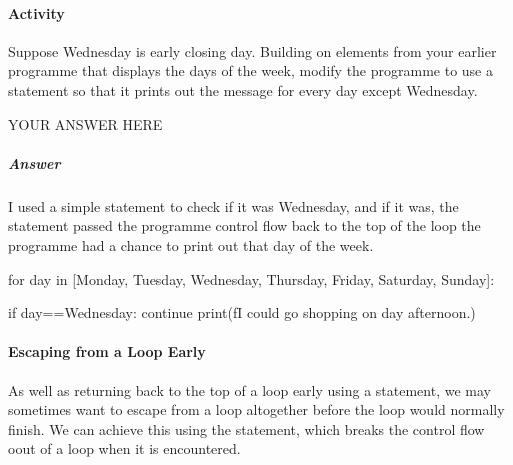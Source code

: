 \documentclass[letterpaper,10pt,english]{sphinxmanual}
\begin{document}
{\paragraph{Activity}
\label{\detokenize{content/02_Robot_Lab/Section_00_01:id1}}
Suppose Wednesday is early closing day. Building on elements from your earlier programme that displays the days of the week, modify the programme to use a  statement so that it prints out the message  for every day except Wednesday.

{
\begin{sphinxVerbatim}[commandchars=\\\{\}]
\llap{\color{nbsphinxin}[ ]:\,\hspace{\fboxrule}\hspace{\fboxsep}}\PYGZsh{} YOUR ANSWER HERE
\end{sphinxVerbatim}
}


\subparagraph{Answer}
\label{\detokenize{content/02_Robot_Lab/Section_00_01:id2}}

I used a simple  statement to check if it was Wednesday, and if it was, the  statement passed the programme control flow back to the top of the loop  the programme had a chance to print out that day of the week.

{
\begin{sphinxVerbatim}[commandchars=\\\{\}]
\llap{\color{nbsphinxin}[ ]:\,\hspace{\fboxrule}\hspace{\fboxsep}}for day in [\PYGZsq{}Monday\PYGZsq{}, \PYGZsq{}Tuesday\PYGZsq{}, \PYGZsq{}Wednesday\PYGZsq{},
            \PYGZsq{}Thursday\PYGZsq{}, \PYGZsq{}Friday\PYGZsq{}, \PYGZsq{}Saturday\PYGZsq{}, \PYGZsq{}Sunday\PYGZsq{}]:

    if day==\PYGZsq{}Wednesday\PYGZsq{}:
        continue
    print(f\PYGZdq{}I could go shopping on \PYGZob{}day\PYGZcb{} afternoon.\PYGZdq{})
\end{sphinxVerbatim}
}


\paragraph{Escaping from a Loop Early}
\label{\detokenize{content/02_Robot_Lab/Section_00_01:Escaping-from-a-Loop-Early}}
As well as returning back to the top of a loop early using a  statement, we may sometimes want to escape from a loop altogether before the loop would normally finish. We can achieve this using the  statement, which breaks the control flow oout of a loop when it is encountered.

}
\end{document}

